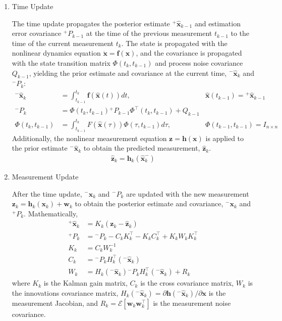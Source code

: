 \begin{enumerate}
    \item Time Update
    
    The time update propagates the posterior estimate ${}^+\hat{\bm{x}}_{k-1}$ and estimation error covariance ${}^+P_{k-1}$ at the time of the previous measurement $t_{k-1}$ to the time of the current measurement $t_k$. The state is propagated with the nonlinear dynamics equation $\dot{\bm{x}} = \bm{f}(\bm{x})$, and the covariance is propagated with the state transition matrix $\Phi(t_k, t_{k-1})$ and process noise covariance $Q_{k-1}$, yielding the prior estimate and covariance at the current time, ${}^-\bm{\hat{x}}_k$ and ${}^-P_k$:
    \begin{align}
        {}^-\hat{\bm{x}}_k &= \int_{t_{k-1}}^{t_k} \bm{f}(\bm{\hat{x}}(t)) dt, & \hat{\bm{x}}(t_{k-1}) = {}^+\hat{\bm{x}}_{k-1} \label{nonlinear estimate propagation (first EKF equation)} \\
        {}^-P_k &= \Phi(t_k, t_{k-1}) {}^+P_{k-1} \Phi^\top(t_k, t_{k-1}) + Q_{k-1}\\
        \Phi(t_k, t_{k-1}) &= \int_{t_{k-1}}^{t_k} F(\hat{\bm{x}}(\tau))\Phi(\tau, t_{k-1}) d\tau, & \Phi(t_{k-1}, t_{k-1}) = I_{n\times n} \label{eq:STM-propagation}
    \end{align}
    Additionally, the nonlinear measurement equation $\bm{z} = \bm{h}(\bm{x})$ is applied to the prior estimate ${}^-\hat{\bm{x}}_k$ to obtain the predicted measurement, $\bm{\hat{z}}_k$.
    \begin{align}
        \bm{\hat{z}}_k = \bm{h}_k(\bm{\hat{x}}_k^-) \label{eq:predicted measurement}
    \end{align}

    \item Measurement Update
    
    After the time update, ${}^-\bm{\hat{x}}_k$ and ${}^-P_k$ are updated with the new measurement $\bm{z}_k = \bm{h}_k(\bm{x}_k) + \bm{w}_k$ to obtain the posterior estimate and covariance, ${}^-\bm{x}_k$ and ${}^+P_k$. Mathematically,
    \begin{align}
        ^+\bm{\hat{x}}_k &= K_k (\bm{z}_k - \bm{\hat{z}}_k) \label{eq:posterior-estimate-update}\\
        ^+P_k &= {}^-P_k - C_k K_k^\top - K_k C_k ^\top + K_k W_k K_k^\top \\
        K_k &= C_k W_k^{-1} \\
        C_k &= {}^-P_k H_k^\top({}^-\bm{\hat{x}}_k) \\
        W_k &= H_k({}^-\bm{\hat{x}}_k) {}^-P_k H_k^\top({}^-\bm{\hat{x}}_k) + R_k \label{eq:innovations covariance (last EKF eq)}
    \end{align}
    \noindent where $K_k$ is the Kalman gain matrix, $C_k$ is the cross covariance matrix, $W_k$ is the innovations covariance matrix, $H_k({}^-\bm{\hat{x}}_k) = \partial \bm{h}({}^-\hat{\bm{x}}_k)/\partial\bm{x}$ is the measurement Jacobian, and $R_k = \mathcal{E}[\bm{w}_k\bm{w}_k^\top]$ is the measurement noise covariance.

\end{enumerate}

